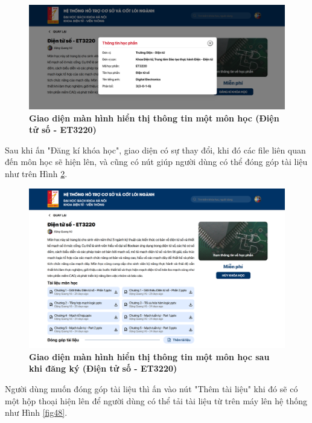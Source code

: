 \documentclass{article}
\begin{document}
	 \begin{figure}[!ht]
	 	\centering
	 	\includegraphics[trim= 10pt 10pt 10pt 10pt, clip, width=14cm]{localhost_3000_courses_ET3220_dialog.png}
	 	\caption [Giao diện màn hình hiển thị thông tin một môn học (Điện tử số - ET3220)]{\bfseries \fontsize{12pt}{0pt}\selectfont Giao diện màn hình hiển thị thông tin một môn học (Điện tử số - ET3220)}
	 	\label{fig46}
	 \end{figure}
	 
	 Sau khi ấn "Đăng kí khóa học", giao diện có sự thay đổi, khi đó các file liên quan đến môn học sẽ hiện lên, và cũng có nút giúp người dùng có thể đóng góp tài liệu như trên Hình \ref{fig47}.
	 
	 \begin{figure}[!ht]
	 	\centering
	 	\includegraphics[trim= 10pt 10pt 10pt 10pt, clip, width=14cm]{localhost_3000_courses_ET3220_subed.png}
	 	\caption [Giao diện màn hình hiển thị thông tin một môn học sau khi đăng ký (Điện tử số - ET3220)]{\bfseries \fontsize{12pt}{0pt}\selectfont Giao diện màn hình hiển thị thông tin một môn học sau khi đăng ký (Điện tử số - ET3220)}
	 	\label{fig47}
	 \end{figure}
	 
	 Người dùng muốn đóng góp tài liệu thì ấn vào nút "Thêm tài liệu" khi đó sẽ có một hộp thoại hiện lên để người dùng có thể tải tài liệu từ trên máy lên hệ thống như Hình \ref{fig48}.
	 
\end{document}
